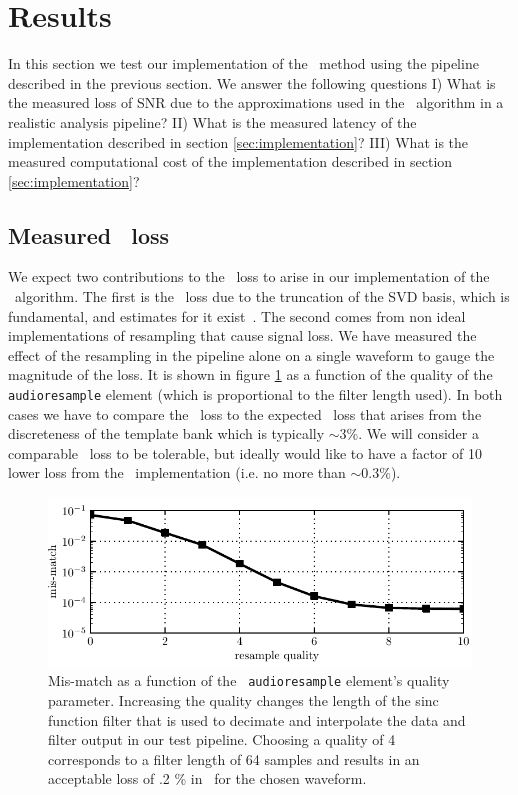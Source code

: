 \section{Results}
\label{SECIV}\label{sec:results}

In this section we test our implementation of the \lloid\ method using the
pipeline described in the previous section.  We answer the following questions
%
I) What is the measured loss of SNR due to the approximations used in the
\lloid\ algorithm in a realistic analysis pipeline?
%
II) What is the measured latency of the implementation described in section
\ref{sec:implementation}?
%
III) What is the measured computational cost of the implementation described in
section \ref{sec:implementation}?

\subsection{Measured \SNR\ loss}

We expect two contributions to the \SNR\ loss to arise in our implementation of
the \lloid\ algorithm.  The first is the \SNR\ loss due to the truncation of
the SVD basis, which is fundamental, and estimates for it
exist~\cite{Cannon:2010p10398}.  The second comes from non ideal
implementations of resampling that cause signal loss.  We have measured the
effect of the resampling in the pipeline alone on a single waveform to gauge
the magnitude of the loss.  It is shown in figure \ref{fig:resamp_mm} as a
function of the quality of the {\tt audioresample} element (which is
proportional to the filter length used).  In both cases we have to compare the
\SNR\ loss to the expected \SNR\ loss that arises from the discreteness of the
template bank which is typically $\sim 3\%$.  We will consider a comparable
\SNR\ loss to be tolerable, but ideally would like to have a factor of 10 lower
loss from the \lloid\ implementation (i.e. no more than $\sim 0.3 \%$).  
%
\begin{figure}
\includegraphics{resamp_mm.pdf}
\caption{\label{fig:resamp_mm}Mis-match as a function of the {\tt
audioresample} element's quality parameter.  Increasing the quality changes the
length of the sinc function filter that is used to decimate and interpolate the
data and filter output in our test pipeline.  Choosing a quality of 4
corresponds to a filter length of 64 samples and results in an acceptable loss
of .2 \% in \SNR\ for the chosen waveform.}
\end{figure}



